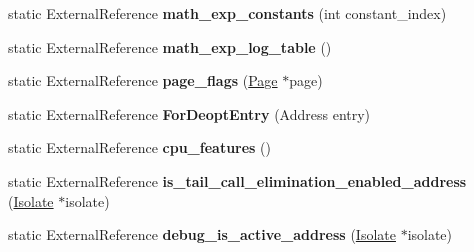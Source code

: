 \begin{DoxyCompactItemize}
\item 
static External\+Reference {\bfseries math\+\_\+exp\+\_\+constants} (int constant\+\_\+index)\hypertarget{classv8_1_1internal_1_1_b_a_s_e___e_m_b_e_d_d_e_d_a53927844161acca1972a90b7fcdcce68}{}\label{classv8_1_1internal_1_1_b_a_s_e___e_m_b_e_d_d_e_d_a53927844161acca1972a90b7fcdcce68}

\item 
static External\+Reference {\bfseries math\+\_\+exp\+\_\+log\+\_\+table} ()\hypertarget{classv8_1_1internal_1_1_b_a_s_e___e_m_b_e_d_d_e_d_a044f7d7cdfd65c5a9361a6b35b511790}{}\label{classv8_1_1internal_1_1_b_a_s_e___e_m_b_e_d_d_e_d_a044f7d7cdfd65c5a9361a6b35b511790}

\item 
static External\+Reference {\bfseries page\+\_\+flags} (\hyperlink{classv8_1_1internal_1_1_page}{Page} $\ast$page)\hypertarget{classv8_1_1internal_1_1_b_a_s_e___e_m_b_e_d_d_e_d_a25b4470ae4332672643bca7e8c80ca27}{}\label{classv8_1_1internal_1_1_b_a_s_e___e_m_b_e_d_d_e_d_a25b4470ae4332672643bca7e8c80ca27}

\item 
static External\+Reference {\bfseries For\+Deopt\+Entry} (Address entry)\hypertarget{classv8_1_1internal_1_1_b_a_s_e___e_m_b_e_d_d_e_d_accb6a41c18efb67f63f933ae6947185f}{}\label{classv8_1_1internal_1_1_b_a_s_e___e_m_b_e_d_d_e_d_accb6a41c18efb67f63f933ae6947185f}

\item 
static External\+Reference {\bfseries cpu\+\_\+features} ()\hypertarget{classv8_1_1internal_1_1_b_a_s_e___e_m_b_e_d_d_e_d_abca6955570d4aff773b742bc6a0d9dd8}{}\label{classv8_1_1internal_1_1_b_a_s_e___e_m_b_e_d_d_e_d_abca6955570d4aff773b742bc6a0d9dd8}

\item 
static External\+Reference {\bfseries is\+\_\+tail\+\_\+call\+\_\+elimination\+\_\+enabled\+\_\+address} (\hyperlink{classv8_1_1internal_1_1_isolate}{Isolate} $\ast$isolate)\hypertarget{classv8_1_1internal_1_1_b_a_s_e___e_m_b_e_d_d_e_d_a6777c88c13a483411f0f5181a43cbaae}{}\label{classv8_1_1internal_1_1_b_a_s_e___e_m_b_e_d_d_e_d_a6777c88c13a483411f0f5181a43cbaae}

\item 
static External\+Reference {\bfseries debug\+\_\+is\+\_\+active\+\_\+address} (\hyperlink{classv8_1_1internal_1_1_isolate}{Isolate} $\ast$isolate)\hypertarget{classv8_1_1internal_1_1_b_a_s_e___e_m_b_e_d_d_e_d_a3ef70c94825802a598792f59b8927d6e}{}\label{classv8_1_1internal_1_1_b_a_s_e___e_m_b_e_d_d_e_d_a3ef70c94825802a598792f59b8927d6e}


\end{DoxyCompactItemize}

